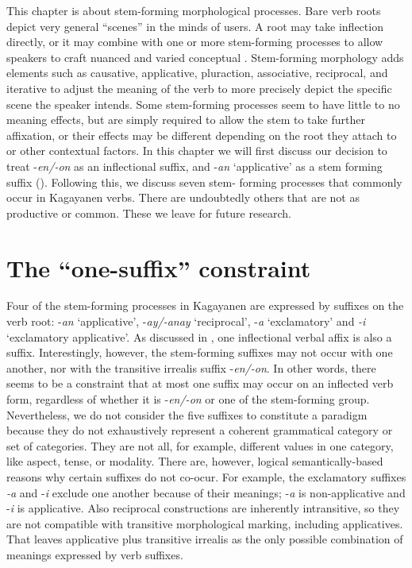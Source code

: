 This chapter is about stem-forming morphological processes. Bare verb roots depict very general “scenes” in the minds of users. A root may take inflection directly, or it may combine with one or more stem-forming processes to allow speakers to craft nuanced and varied conceptual . Stem-forming morphology adds elements such as causative, applicative, pluraction, associative, reciprocal, and iterative to adjust the meaning of the verb to more precisely depict the specific scene the speaker intends. Some stem-forming processes seem to have little to no meaning effects, but are simply required to allow the stem to take further affixation, or their effects may be different depending on the root they attach to or other contextual factors. In this chapter we will first discuss our decision to treat -\textit{en/-on} as an inflectional suffix, and -\textit{an} ‘applicative’ as a stem forming suffix (). Following this, we discuss seven stem- forming processes that commonly occur in Kagayanen verbs. There are undoubtedly others that are not as productive or common. These we leave for future research.

\section{The “one-suffix” constraint}
\label{bkm:Ref123018118}
Four of the stem-forming processes in Kagayanen are expressed by suffixes on the verb root: -\textit{an} ‘applicative’, -\textit{ay/-anay} ‘reciprocal’, -\textit{a} ‘exclamatory’ and \textit{{}-i} ‘exclamatory applicative’.  As discussed in , one inflectional verbal affix is also a suffix. Interestingly, however, the stem-forming suffixes may not occur with one another, nor with the transitive irrealis suffix -\textit{en/-on}. In other words, there seems to be a constraint that at most one suffix may occur on an inflected verb form, regardless of whether it is -\textit{en/-on} or one of the stem-forming group. Nevertheless, we do not consider the five suffixes to constitute a paradigm because they do not exhaustively represent a coherent grammatical category or set of categories. They are not all, for example, different values in one category, like aspect, tense, or modality. There are, however, logical semantically-based reasons why certain suffixes do not co-ocur. For example, the exclamatory suffixes \textit{{}-a} and -\textit{i} exclude one another because of their meanings; -\textit{a} is non-applicative and -\textit{i} is applicative. Also reciprocal constructions are inherently intransitive, so they are not compatible with transitive morphological marking, including applicatives. That leaves applicative plus transitive irrealis as the only possible combination of meanings expressed by verb suffixes.

